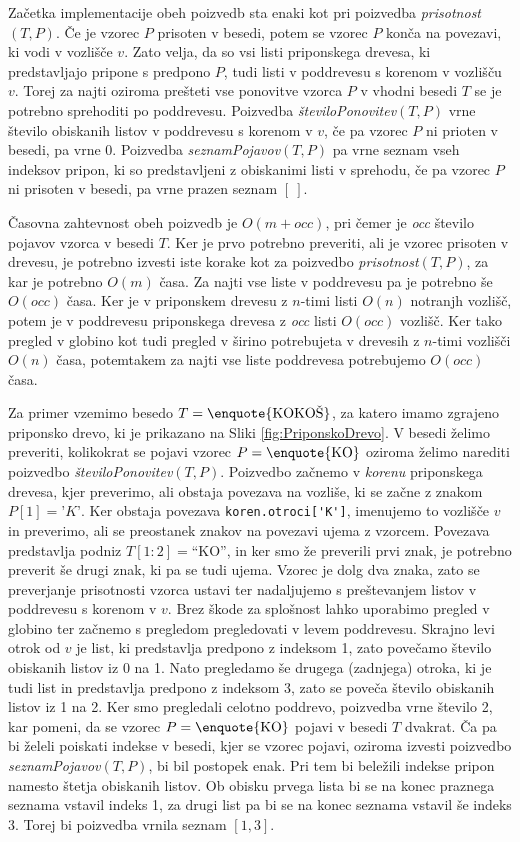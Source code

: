 Začetka implementacije obeh poizvedb sta enaki kot pri poizvedba \textit{prisotnost}$(T,P)$. Če je vzorec $P$ prisoten v besedi, potem se vzorec $P$ konča na povezavi, ki vodi v vozlišče $v$. Zato velja, da so vsi listi priponskega drevesa, ki predstavljajo pripone s predpono $P$, tudi listi v poddrevesu s korenom v vozlišču $v$. Torej za najti oziroma prešteti vse ponovitve vzorca $P$ v vhodni besedi $T$ se je potrebno sprehoditi po poddrevesu. Poizvedba \textit{številoPonovitev}$(T,P)$ vrne število obiskanih listov v poddrevesu s korenom v $v$, če pa vzorec $P$ ni prioten v besedi, pa vrne $0$. Poizvedba \textit{seznamPojavov}$(T,P)$ pa vrne seznam vseh indeksov pripon, ki so predstavljeni z obiskanimi listi v sprehodu, če pa vzorec $P$ ni prisoten v besedi, pa vrne prazen seznam $[~]$.

Časovna zahtevnost obeh poizvedb je $O(m+\textit{occ})$, pri čemer je \textit{occ} število pojavov vzorca v besedi $T$. Ker je prvo potrebno preveriti, ali je vzorec prisoten v drevesu, je potrebno izvesti iste korake kot za poizvedbo \textit{prisotnost}$(T,P)$, za kar je potrebno $O(m)$ časa. Za najti vse liste v poddrevesu pa je potrebno še $O(\textit{occ})$ časa. Ker je v priponskem drevesu z $n$-timi listi $O(n)$ notranjh vozlišč, potem je v poddrevesu priponskega drevesa z \textit{occ} listi $O(\textit{occ})$ vozlišč. Ker tako pregled v globino kot tudi pregled v širino potrebujeta v drevesih z $n$-timi vozlišči $O(n)$ časa, potemtakem za najti vse liste poddrevesa potrebujemo $O(\textit{occ})$ časa.

Za primer vzemimo besedo $T=\text{\enquote{KOKOŠ}}$, za katero imamo zgrajeno priponsko drevo, ki je prikazano na Sliki \ref{fig:PriponskoDrevo}. V besedi želimo preveriti, kolikokrat se pojavi vzorec $P=\text{\enquote{KO}}$ oziroma želimo narediti poizvedbo \textit{številoPonovitev}$(T,P)$. Poizvedbo začnemo v \textit{korenu} priponskega drevesa, kjer preverimo, ali obstaja povezava na vozliše, ki se začne z znakom $P[1]=\textit{'K'}$. Ker obstaja povezava \verb|koren.otroci['K']|, imenujemo to vozlišče $v$ in preverimo, ali se preostanek znakov na povezavi ujema z vzorcem. Povezava predstavlja podniz $T[1:2]=$\enquote{KO}, in ker smo že preverili prvi znak, je potrebno preverit še drugi znak, ki pa se tudi ujema. Vzorec je dolg dva znaka, zato se preverjanje prisotnosti vzorca ustavi ter nadaljujemo s preštevanjem listov v poddrevesu s korenom v $v$. Brez škode za splošnost lahko uporabimo pregled v globino ter začnemo s pregledom pregledovati v levem poddrevesu. Skrajno levi otrok od $v$ je list, ki predstavlja predpono z indeksom 1, zato povečamo število obiskanih listov iz 0 na 1. Nato pregledamo še drugega (zadnjega) otroka, ki je tudi list in predstavlja predpono z indeksom 3, zato se poveča število obiskanih listov iz 1 na 2. Ker smo pregledali celotno poddrevo, poizvedba vrne število 2, kar pomeni, da se vzorec $P=\text{\enquote{KO}}$ pojavi v besedi $T$ dvakrat. Ča pa bi želeli poiskati indekse v besedi, kjer se vzorec pojavi, oziroma izvesti poizvedbo \textit{seznamPojavov}$(T,P)$, bi bil postopek enak. Pri tem bi beležili indekse pripon namesto štetja obiskanih listov. Ob obisku prvega lista bi se na konec praznega seznama vstavil indeks 1, za drugi list pa bi se na konec seznama vstavil še indeks 3. Torej bi poizvedba vrnila seznam $[1,3]$.